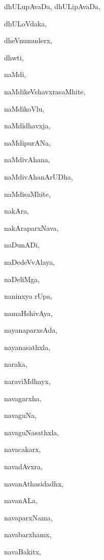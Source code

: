 \begin{multicols}{2}
{dhULupAvaDa, dhULipAvaDa}, \pageref{dhULupAvaDa, dhULipAvaDa}

{dhULoVdaka}, \pageref{dhULoVdaka}

{dheVnumuderx}, \pageref{dheVnumuderx}

{dhwti}, \pageref{dhwti}

{naMdi}, \pageref{naMdi}

{naMdikeVshavxrasaMhite}, \pageref{naMdikeVshavxrasaMhite}

{naMdikoVlu}, \pageref{naMdikoVlu}

{naMdidhavxja}, \pageref{naMdidhavxja}

{naMdipurANa}, \pageref{naMdipurANa}

{naMdivAhana}, \pageref{naMdivAhana}

{naMdivAhanArUDha}, \pageref{naMdivAhanArUDha}

{naMdisaMhite}, \pageref{naMdisaMhite}

{nakAra}, \pageref{nakAra}

{nakAraparxNava}, \pageref{nakAraparxNava}

{naDunADi}, \pageref{naDunADi}

{naDedeVvAlaya}, \pageref{naDedeVvAlaya}

{naDeliMga}, \pageref{naDeliMga}

{naninxya rUpa}, \pageref{naninxya rUpa}

{namaHshivAya}, \pageref{namaHshivAya}

{nayanaparxsAda}, \pageref{nayanaparxsAda}

{nayanasathxla}, \pageref{nayanasathxla}

{naraka}, \pageref{naraka}

{naraviMdhayx}, \pageref{naraviMdhayx}

{navagarxha}, \pageref{navagarxha}

{navaguNa}, \pageref{navaguNa}

{navaguNasathxla}, \pageref{navaguNasathxla}

{navacakarx}, \pageref{navacakarx}

{navadAvxra}, \pageref{navadAvxra}

{navanAthasidadhx}, \pageref{navanAthasidadhx}

{navanALa}, \pageref{navanALa}

{navaparxNama}, \pageref{navaparxNama}

{navabarxhamx}, \pageref{navabarxhamx}

{navaBakitx}, \pageref{navaBakitx}


\end{multicols}
